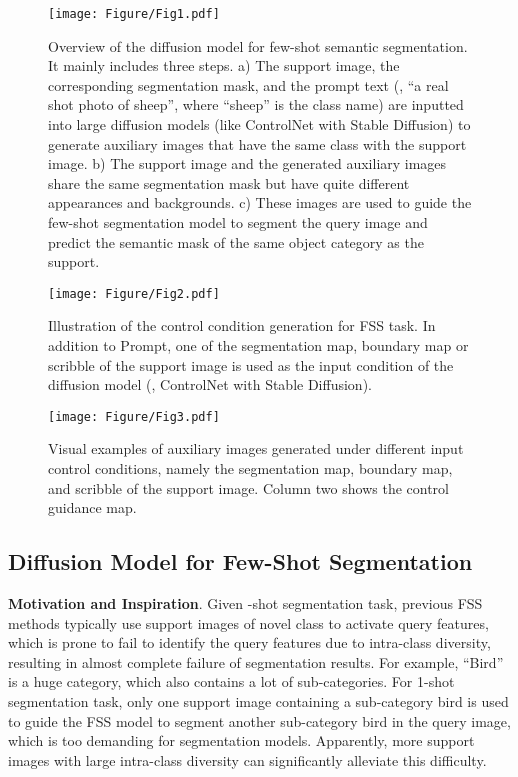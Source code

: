 \documentclass[sigconf]{acmart}
\begin{document}
\begin{figure}[tb]
    \texttt{[image: Figure/Fig1.pdf]}
    \caption{Overview of the diffusion model for few-shot semantic segmentation. It mainly includes three steps. a) The support image, the corresponding segmentation mask, and the prompt text (, “a real shot photo of sheep”, where ``sheep'' is the class name) are inputted into large diffusion models (like ControlNet with Stable Diffusion) to generate auxiliary images that have the same class with the support image. b) The support image and the generated auxiliary images share the same segmentation mask but have quite different appearances and backgrounds. c) These images are used to guide the few-shot segmentation model to segment the query image and predict the semantic mask of the same object category as the support.}
    \label{Fig1_label}
\end{figure}


\begin{figure}[tb]
    \texttt{[image: Figure/Fig2.pdf]}
    \caption{Illustration of the control condition generation for FSS task. In addition to Prompt, one of the segmentation map, boundary map or scribble of the support image is used as the input condition of the diffusion model (, ControlNet with Stable Diffusion).}
    \label{Fig2_label}
\end{figure}

\begin{figure}[tb]
    \texttt{[image: Figure/Fig3.pdf]}
    \caption{Visual examples of auxiliary images generated under different input control conditions, namely the segmentation map, boundary map, and scribble of the support image. Column two shows the control guidance map.}
    \label{Fig3_label}
\end{figure}



\subsection{Diffusion Model for Few-Shot Segmentation}
\textbf{Motivation and Inspiration}. Given -shot segmentation task, previous FSS methods \cite{BAM2022,pfenet,Li2021AdaptivePL,HDMNet2023} typically use  support images of novel class to activate query features, which is prone to fail to identify the query features due to intra-class diversity, resulting in almost complete failure of segmentation results. For example, ``Bird'' is a huge category, which also contains a lot of sub-categories. For 1-shot segmentation task, only one support image containing a sub-category bird is used to guide the FSS model to segment another sub-category bird in the query image, which is too demanding for segmentation models. Apparently, more support images with large intra-class diversity can significantly alleviate this difficulty. 
\end{document}
